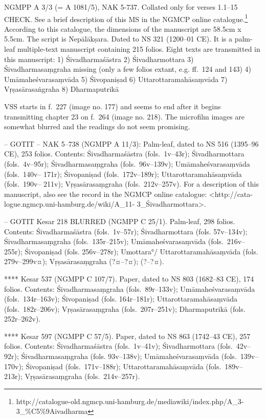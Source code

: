 \documentclass[11pt]{book}
\begin{document}
NGMPP A 3/3 (= A 1081/5), NAK 5-737. Collated only for verses 1.1--15
CHECK. See a brief description of this MS in the NGMCP online
catalogue.\footnote{http://catalogue-old.ngmcp.uni-hamburg.de/mediawiki/index.php/A\_3-3\_\%C5\%9Aivadharma
} According to this catalogue, the dimensions of the manuscript are
58.5cm x 5.5cm. The script is Nepālākṣara. Dated to NS 321 (1200--01
CE). It is a palm-leaf multiple-text manuscript containing 215 folios.
Eight texts are transmitted in this manuscript: 1) Śivadharmaśāstra 2)
Śivadharmottara 3) Śivadharmasaṃgraha missing (only a few folios extant,
e.g. ff.~124 and 143) 4) Umāmaheśvarasaṃvāda 5) Śivopaniṣad 6)
Uttarottaramahāsaṃvāda 7) Vṛṣasārasaṅgraha 8) Dharmaputrikā

VSS starts in f.~227 (image no. 177) and seems to end after it begins
transmitting chapter 23 on f.~264 (image no. 218). The microfilm images
are somewhat blurred and the readings do not seem promising.

-- GOTIT -- NAK 5--738 (NGMPP A 11/3): Palm-leaf, dated to NS 516
(1395--96 CE), 253 folios. Contents: Śivadharmaśāstra (fols.~1v--43r);
Śivadharmottara (fols.~4v--95r); Śivadharmasaṃgraha (fols.~96v--139v);
Umāmaheśvarasaṃvāda (fols.~140v-- 171r); Śivopaniṣad (fols.~172v--189r);
Uttarottaramahāsaṃvāda (fols.~190v-- 211v); Vṛṣasārasaṃgraha
(fols.~212v--257v). For a description of this manuscript, also see the
record in the NGMCP online catalogue: \textless{}http://cata-
logue.ngmcp.uni-hamburg.de/wiki/A\_11- 3\_Śivadharmottara\textgreater{}.

-- GOTIT Kesar 218 BLURRED (NGMPP C 25/1). Palm-leaf, 298 folios.
Contents: Śivadharmaśāstra (fols.~1v--57r); Śivadharmottara (fols.
57v--134v); Śivadharmasaṃgraha (fols.~135r--215v); Umāmaheśvarasaṃvāda
(fols.~216v--255r); Śivopaniṣad (fols. 256v--278r); Umottara°/
Uttarottaramahāsaṃvāda (fols. 279v--299v¤); Vṛṣasārasaṃgraha (?¤--?¤);
(?--?¤).

**** Kesar 537 (NGMPP C 107/7). Paper, dated to NS 803 (1682--83 CE),
174 folios. Contents: Śivadharmasaṃgraha (fols.~89r--133v);
Umāmaheśvarasaṃvāda (fols.~134r--163v); Śivopaniṣad (fols. 164r--181r);
Uttarottaramahāsaṃvāda (fols.~182r--206v); Vṛṣasārasaṃgraha
(fols.~207r--251v); Dharmaputrikā (fols. 252r--262v).

**** Kesar 597 (NGMPP C 57/5). Paper, dated to NS 863 (1742--43 CE), 257
folios. Contents: Śivadharmaśāstra (fols.~1v--41v); Śivadharmottara
(fols.~42v--92r); Śivadharmasaṃgraha (fols. 93v--138v);
Umāmaheśvarasaṃvāda (fols.~139v-- 170v); Śivopaniṣad (fols.~171v--188r);
Uttarottaramahāsaṃvāda (fols.~189v-- 213r); Vṛṣasārasaṃgraha
(fols.~214v--257r).
\end{document}
